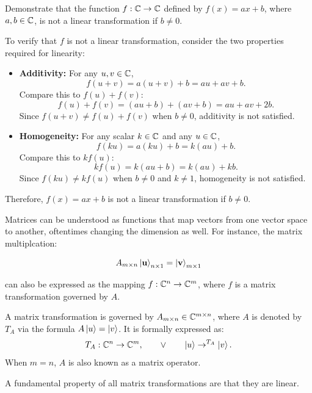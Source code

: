 \documentclass[12pt]{article}
\begin{document}
\begin{example}
Demonstrate that the function \(f : \mathbb{C} \to \mathbb{C}\) defined by \(f(x) = ax + b\), where \(a, b \in \mathbb{C}\), is not a linear transformation if \(b \ne 0\).
\end{example}


\begin{solution}
To verify that \(f\) is not a linear transformation, consider the two properties required for linearity:

\begin{itemize}
  \item \textbf{Additivity:} For any \(u, v \in \mathbb{C}\),
  \[
    f(u + v) = a(u + v) + b = au + av + b.
  \]
  Compare this to \(f(u) + f(v)\):
  \[
    f(u) + f(v) = (au + b) + (av + b) = au + av + 2b.
  \]
  Since \(f(u + v) \ne f(u) + f(v)\) when \(b \ne 0\), additivity is not satisfied.

  \item \textbf{Homogeneity:} For any scalar \(k \in \mathbb{C}\) and any \(u \in \mathbb{C}\),
  \[
    f(ku) = a(ku) + b = k(au) + b.
  \]
  Compare this to \(k f(u)\):
  \[
    k f(u) = k(au + b) = k(au) + kb.
  \]
  Since \(f(ku) \ne k f(u)\) when \(b \ne 0\) and \(k \ne 1\), homogeneity is not satisfied.
\end{itemize}

Therefore, \(f(x) = ax + b\) is not a linear transformation if \(b \ne 0\).
\end{solution}

Matrices can be understood as functions that map vectors from one vector space to another, oftentimes changing the dimension as well. For instance, the matrix multiplcation:

\[
A_{m \times n} \ket{\mathbf{u}}_{n \times 1} = \ket{\mathbf{v}}_{m \times 1}
\]

can also be expressed as the mapping $f: \mathbb{C}^n \rightarrow \mathbb{C}^m$, where $f$ is a matrix transformation governed by $A$. 

\begin{definition}
    A matrix transformation is governed by $A_{{m \times n}} \in \mathbb{C}^{m \times n}$, where $A$ is denoted by $T_A$ via the formula $A \ket{u} = \ket{v}$. It is formally expressed as:
    \[
    T_A: \mathbb{C}^n \rightarrow \mathbb{C}^m, \qquad \lor \qquad \ket{u} \rightarrow^{T_A} \ket{v}.
    \]
    When $m = n$, $A$ is also known as a matrix operator. 
\end{definition}


A fundamental property of all matrix transformations are that they are linear. 
\end{document}
